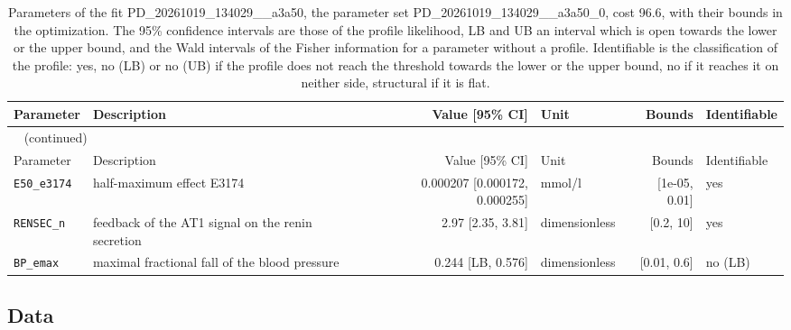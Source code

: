 \documentclass{article}
\begin{document}
\begin{longtable}{llrlrl}
\caption{Parameters of the fit PD\_20261019\_134029\_\_a3a50, the parameter set PD\_20261019\_134029\_\_a3a50\_0, cost 96.6, with their bounds in the optimization. The 95\% confidence intervals are those of the profile likelihood, LB and UB an interval which is open towards the lower or the upper bound, and the Wald intervals of the Fisher information for a parameter without a profile. Identifiable is the classification of the profile: yes, no (LB) or no (UB) if the profile does not reach the threshold towards the lower or the upper bound, no if it reaches it on neither side, structural if it is flat.}\label{tab:parameters:PD_20261019_134029__a3a50} \\
\toprule
Parameter & Description & Value [95\% CI] & Unit & Bounds & Identifiable \\
\midrule
\endfirsthead
\multicolumn{6}{l}{\small\tablename~\thetable{} (continued)} \\
\toprule
Parameter & Description & Value [95\% CI] & Unit & Bounds & Identifiable \\
\midrule
\endhead
\bottomrule
\endlastfoot
\texttt{E50\_e3174} & half-maximum effect E3174 & 0.000207 [0.000172, 0.000255] & mmol/l & [1e-05, 0.01] & yes \\
\texttt{RENSEC\_n} & feedback of the AT1 signal on the renin secretion & 2.97 [2.35, 3.81] & dimensionless & [0.2, 10] & yes \\
\texttt{BP\_emax} & maximal fractional fall of the blood pressure & 0.244 [LB, 0.576] & dimensionless & [0.01, 0.6] & no (LB) \\
\end{longtable}

\subsection{Data}
\end{document}
